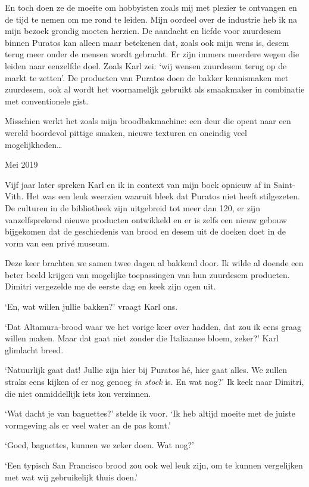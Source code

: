 \documentclass[
  11pt,
  dutch,
]{memoir}
\begin{document}
En toch doen ze de moeite om hobbyisten zoals mij met plezier te
ontvangen en de tijd te nemen om me rond te leiden. Mijn oordeel over de
industrie heb ik na mijn bezoek grondig moeten herzien. De aandacht en
liefde voor zuurdesem binnen Puratos kan alleen maar betekenen dat,
zoals ook mijn wens is, desem terug meer onder de mensen wordt gebracht.
Er zijn immers meerdere wegen die leiden naar eenzelfde doel. Zoals Karl
zei: `wij wensen zuurdesem terug op de markt te zetten'. De producten
van Puratos doen de bakker kennismaken met zuurdesem, ook al wordt het
voornamelijk gebruikt als smaakmaker in combinatie met conventionele
gist.

Misschien werkt het zoals mijn broodbakmachine: een deur die opent naar
een wereld boordevol pittige smaken, nieuwe texturen en oneindig veel
mogelijkheden\ldots{}

\begin{flushright}
Mei 2019
\end{flushright}

Vijf jaar later spreken Karl en ik in context van mijn boek opnieuw af
in Saint-Vith. Het was een leuk weerzien waaruit bleek dat Puratos niet
heeft stilgezeten. De culturen in de bibliotheek zijn uitgebreid tot
meer dan 120, er zijn vanzelfsprekend nieuwe producten ontwikkeld en er
is zelfs een nieuw gebouw bijgekomen dat de geschiedenis van brood en
desem uit de doeken doet in de vorm van een privé museum.

Deze keer brachten we samen twee dagen al bakkend door. Ik wilde al
doende een beter beeld krijgen van mogelijke toepassingen van hun
zuurdesem producten. Dimitri vergezelde me de eerste dag en keek zijn
ogen uit.

`En, wat willen jullie bakken?' vraagt Karl ons.

`Dat Altamura-brood waar we het vorige keer over hadden, dat zou ik eens
graag willen maken. Maar dat gaat niet zonder die Italiaanse bloem,
zeker?' Karl glimlacht breed.

`Natuurlijk gaat dat! Jullie zijn hier bij Puratos hé, hier gaat alles.
We zullen straks eens kijken of er nog genoeg \emph{in stock} is. En wat
nog?' Ik keek naar Dimitri, die niet onmiddellijk iets kon verzinnen.

`Wat dacht je van baguettes?' stelde ik voor. `Ik heb altijd moeite met
de juiste vormgeving als er veel water an de pas komt.'

`Goed, baguettes, kunnen we zeker doen. Wat nog?'

`Een typisch San Francisco brood zou ook wel leuk zijn, om te kunnen
vergelijken met wat wij gebruikelijk thuis doen.'
\end{document}

